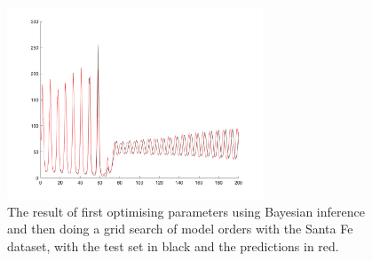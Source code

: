 \documentclass[10pt,a4paper]{article}
\begin{document}
\begin{figure}[h!]
\centering
  \includegraphics[width=3in]{order50Santa.png}
  \caption{The result of first optimising parameters using Bayesian inference and then doing a grid search of model orders with the Santa Fe dataset, with the test set in black and the predictions in red.}
  \label{fig:order50Santa}
\end{figure}



\end{document}
